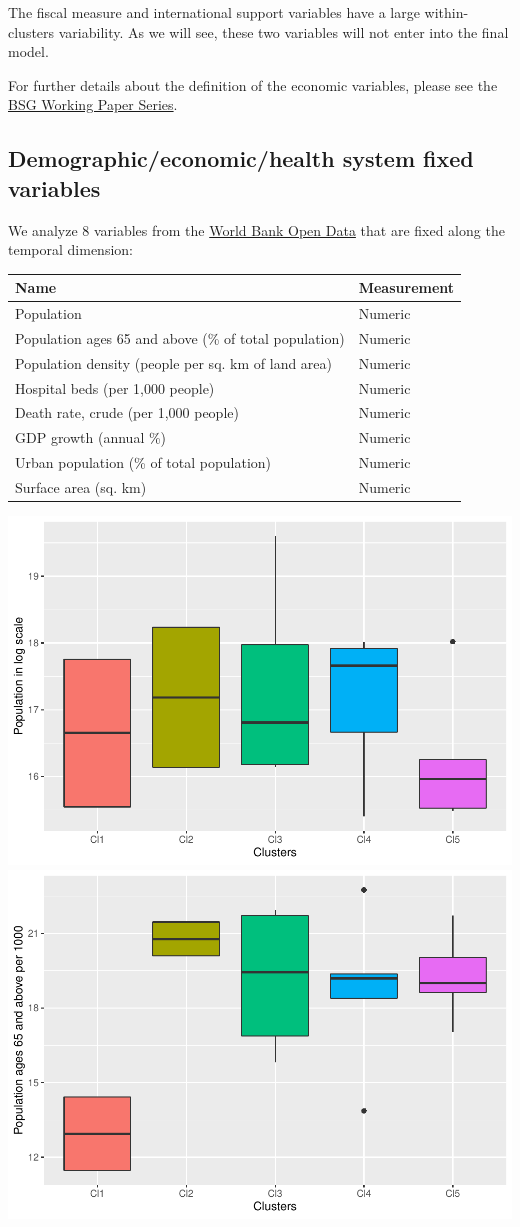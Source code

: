 \documentclass[
  6pt,
]{article}
\begin{document}
The fiscal measure and international support variables have a large
within-clusters variability. As we will see, these two variables will
not enter into the final model.

For further details about the definition of the economic variables,
please see the
\href{https://www.bsg.ox.ac.uk/sites/default/files/2020-05/BSG-WP-2020-032-v5.0_0.pdf}{BSG
Working Paper Series}.

\hypertarget{demographiceconomichealth-system-fixed-variables}{%
\subsection{Demographic/economic/health system fixed
variables}\label{demographiceconomichealth-system-fixed-variables}}

We analyze \(8\) variables from the
\href{https://data.worldbank.org/}{World Bank Open Data} that are fixed
along the temporal dimension:

\begin{longtable}[]{@{}ll@{}}
\toprule
\textbf{Name} & \textbf{Measurement}\tabularnewline
\midrule
\endhead
Population & Numeric\tabularnewline
Population ages 65 and above (\% of total population) &
Numeric\tabularnewline
Population density (people per sq. km of land area) &
Numeric\tabularnewline
Hospital beds (per 1,000 people) & Numeric\tabularnewline
Death rate, crude (per 1,000 people) & Numeric\tabularnewline
GDP growth (annual \%) & Numeric\tabularnewline
Urban population (\% of total population) & Numeric\tabularnewline
Surface area (sq. km) & Numeric\tabularnewline
\bottomrule
\end{longtable}

\includegraphics[width=.5\textwidth]{Report_SC_Group3_files/figure-latex/unnamed-chunk-8-1.pdf}
\includegraphics[width=.5\textwidth]{Report_SC_Group3_files/figure-latex/unnamed-chunk-8-2.pdf}
\end{document}
